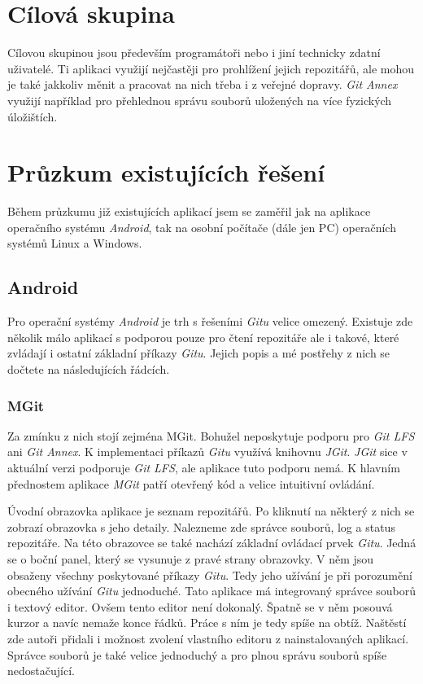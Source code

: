 \section{Cílová skupina}
Cílovou skupinou jsou především programátoři nebo i jiní technicky zdatní uživatelé. Ti aplikaci využijí nejčastěji pro prohlížení jejich repozitářů, ale mohou je také jakkoliv měnit a pracovat na nich třeba i z veřejné dopravy. \emph{Git Annex} využijí například pro přehlednou správu souborů uložených na více fyzických úložištích.

\section{Průzkum existujících řešení}
Během průzkumu již existujících aplikací jsem se zaměřil jak na aplikace operačního systému \emph{Android}, tak na osobní počítače (dále jen PC) operačních systémů Linux a Windows.

    \subsection {Android}
    Pro operační systémy \emph{Android} je trh s řešeními \emph{Gitu} velice omezený. Existuje zde několik málo aplikací s podporou pouze pro čtení repozitáře ale i takové, které zvládají i ostatní základní příkazy \emph{Gitu}. Jejich popis a mé postřehy z nich se dočtete na následujících řádcích.

        \subsubsection{MGit~}
        Za zmínku z nich stojí zejména MGit. Bohužel neposkytuje podporu pro \emph{Git LFS} ani \emph{Git Annex}. K implementaci příkazů \emph{Gitu} využívá knihovnu \emph{JGit}. \emph{JGit} sice v aktuální verzi podporuje \emph{Git LFS}, ale aplikace tuto podporu nemá. K hlavním přednostem aplikace \emph{MGit} patří otevřený kód a velice intuitivní ovládání.

        Úvodní obrazovka aplikace je seznam repozitářů. Po kliknutí na některý z nich se zobrazí obrazovka s jeho detaily. Nalezneme zde správce souborů, log a status repozitáře. Na této obrazovce se také nachází základní ovládací prvek \emph{Gitu}. Jedná se o boční panel, který se vysunuje z pravé strany obrazovky. V něm jsou obsaženy všechny poskytované příkazy \emph{Gitu}. Tedy jeho užívání je při porozumění obecného užívání \emph{Gitu} jednoduché. Tato aplikace má integrovaný správce souborů i textový editor. Ovšem tento editor není dokonalý. Špatně se v něm posouvá kurzor a navíc nemaže konce řádků. Práce s ním je tedy spíše na obtíž. Naštěstí zde autoři přidali i možnost zvolení vlastního editoru z nainstalovaných aplikací. Správce souborů je také velice jednoduchý a pro plnou správu souborů spíše nedostačující.

